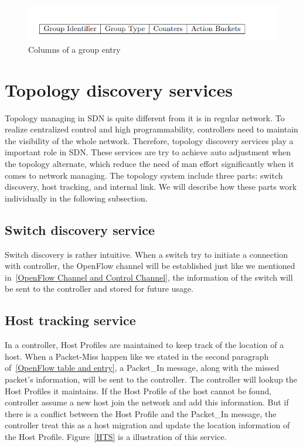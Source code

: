 \begin{figure}[H]
\begin{center} 
\includegraphics[width=1\textwidth]{figures/group_table.png}
\end{center}
\caption{Columns of a group entry}
\label{GE_Col}
\end{figure}

\section{Topology discovery services}
\label{Topology discovery services}
Topology managing in SDN is quite different from it is in regular network. To realize centralized control and high programmability, controllers need to maintain the visibility of the whole network. Therefore, topology discovery services play a important role in SDN. These services are try to achieve auto adjustment when the topology alternate, which reduce the need of man effort significantly when it comes to network managing. The topology system include three parts: switch discovery, host tracking, and internal link. We will describe how these parts work individually in the following subsection.

\subsection{Switch discovery service}
\label{Switch discovery service}
Switch discovery is rather intuitive. When a switch try to initiate a connection with controller, the OpenFlow channel will be established just like we mentioned in~\ref{OpenFlow Channel and Control Channel}, the information of the switch will be sent to the controller and stored for future usage. 

\subsection{Host tracking service}
\label{Host tracking service}
In a controller, Host Profiles are maintained to keep track of the location of a host. When a Packet-Miss happen like we stated in the second paragraph of~\ref{OpenFlow table and entry}, a Packet_In message, along with the missed packet's information, will be sent to the controller. The controller will lookup the Host Profiles it maintains. If the Host Profile of the host cannot be found, controller assume a new host join the network and add this information. But if there is a conflict between the Host Profile and the Packet_In message, the controller treat this as a host migration and update the location information of the Host Profile. Figure~\ref{HTS} is a illustration of this service.


